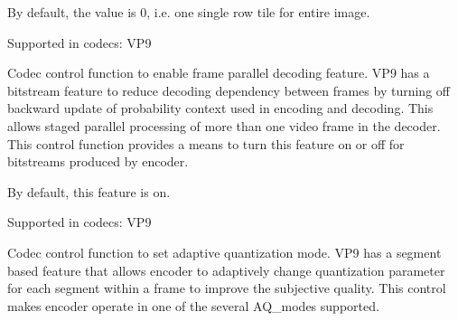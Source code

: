 \begin{Desc}
\begin{description}
By default, the value is 0, i.\+e. one single row tile for entire image.

Supported in codecs\+: V\+P9 \item[{\em 
V\+P9\+E\+\_\+\+S\+E\+T\+\_\+\+F\+R\+A\+M\+E\+\_\+\+P\+A\+R\+A\+L\+L\+E\+L\+\_\+\+D\+E\+C\+O\+D\+I\+NG\hypertarget{group__vp8__encoder_gga6deae3d561c838952552c3d3756322eca7e61bfc05a2eb5a53d8f2091ebc5d40e}{}\label{group__vp8__encoder_gga6deae3d561c838952552c3d3756322eca7e61bfc05a2eb5a53d8f2091ebc5d40e}
}]Codec control function to enable frame parallel decoding feature. V\+P9 has a bitstream feature to reduce decoding dependency between frames by turning off backward update of probability context used in encoding and decoding. This allows staged parallel processing of more than one video frame in the decoder. This control function provides a means to turn this feature on or off for bitstreams produced by encoder.

By default, this feature is on.

Supported in codecs\+: V\+P9 \item[{\em 
V\+P9\+E\+\_\+\+S\+E\+T\+\_\+\+A\+Q\+\_\+\+M\+O\+DE\hypertarget{group__vp8__encoder_gga6deae3d561c838952552c3d3756322eca375af288e2d7fa169cbfef4ba586c1d2}{}\label{group__vp8__encoder_gga6deae3d561c838952552c3d3756322eca375af288e2d7fa169cbfef4ba586c1d2}
}]Codec control function to set adaptive quantization mode. V\+P9 has a segment based feature that allows encoder to adaptively change quantization parameter for each segment within a frame to improve the subjective quality. This control makes encoder operate in one of the several A\+Q\+\_\+modes supported.


\end{description}
\end{Desc}
